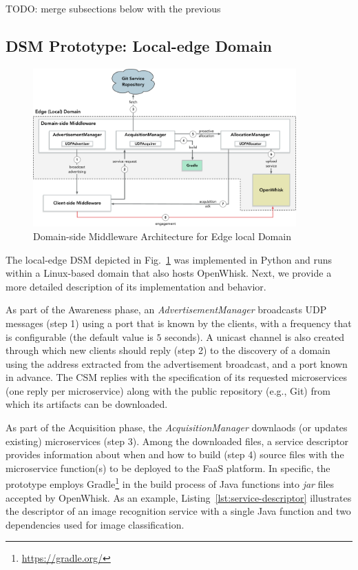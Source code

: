 



TODO: merge subsections below with the previous 

\subsection{DSM Prototype: Local-edge Domain}

\begin{figure}[tbp]
	\includegraphics[width=0.9\textwidth]{figs/a3e-domain-prototype}
	\caption{Domain-side Middleware Architecture for Edge local Domain}
	\label{fig:local-edge-domain-prototype}
\end{figure}

The local-edge DSM depicted in Fig.~\ref{fig:local-edge-domain-prototype} was implemented in Python and runs within a Linux-based domain that also hosts OpenWhisk. Next, we provide a more detailed description of its implementation and behavior.

As part of the Awareness phase, an \textit{AdvertisementManager} broadcasts UDP messages (step 1) using a port that is known by the clients, with a frequency that is configurable (the default value is $5$ seconds). A unicast channel is also created through which new clients should reply (step 2) to the discovery of a domain using the address extracted from the advertisement broadcast, and a port known in advance. The CSM replies with the specification of its requested microservices (one reply per microservice) along with the public repository (e.g., Git) from which its artifacts can be downloaded.

As part of the Acquisition phase, the \textit{AcquisitionManager} downlaods (or updates existing) microservices (step 3). Among the downloaded files, a service descriptor provides information about when and how to build (step 4) source files with the microservice function(s) to be deployed to the FaaS platform. In specific, the prototype employs Gradle\footnote{\url{https://gradle.org/}} in the build process of Java functions into \textit{jar} files accepted by OpenWhisk. As an example, Listing~\ref{lst:service-descriptor} illustrates the descriptor of an image recognition service with a single Java function and two dependencies used for image classification.

